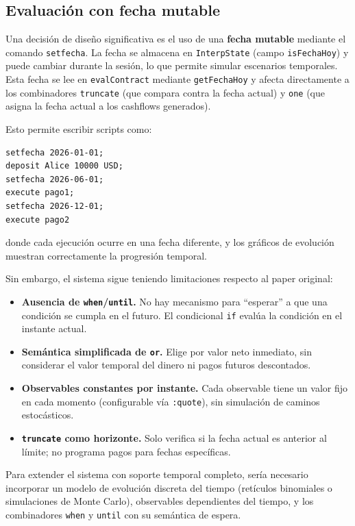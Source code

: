 \documentclass[a4paper, 12pt]{article}
\begin{document}
\subsection{Evaluación con fecha mutable}

Una decisión de diseño significativa es el uso de una \textbf{fecha mutable} mediante el comando \texttt{setfecha}. La fecha se almacena en \texttt{InterpState} (campo \texttt{isFechaHoy}) y puede cambiar durante la sesión, lo que permite simular escenarios temporales. Esta fecha se lee en \texttt{evalContract} mediante \texttt{getFechaHoy} y afecta directamente a los combinadores \texttt{truncate} (que compara contra la fecha actual) y \texttt{one} (que asigna la fecha actual a los cashflows generados).

Esto permite escribir scripts como:

\begin{lstlisting}[style=finstyle, caption={Simulación temporal}, numbers=none]
setfecha 2026-01-01;
deposit Alice 10000 USD;
setfecha 2026-06-01;
execute pago1;
setfecha 2026-12-01;
execute pago2
\end{lstlisting}

donde cada ejecución ocurre en una fecha diferente, y los gráficos de evolución muestran correctamente la progresión temporal.

Sin embargo, el sistema sigue teniendo limitaciones respecto al paper original:

\begin{itemize}
    \item \textbf{Ausencia de \texttt{when}/\texttt{until}.} No hay mecanismo para ``esperar'' a que una condición se cumpla en el futuro. El condicional \texttt{if} evalúa la condición en el instante actual.
    \item \textbf{Semántica simplificada de \texttt{or}.} Elige por valor neto inmediato, sin considerar el valor temporal del dinero ni pagos futuros descontados.
    \item \textbf{Observables constantes por instante.} Cada observable tiene un valor fijo en cada momento (configurable vía \texttt{:quote}), sin simulación de caminos estocásticos.
    \item \textbf{\texttt{truncate} como horizonte.} Solo verifica si la fecha actual es anterior al límite; no programa pagos para fechas específicas.
\end{itemize}

Para extender el sistema con soporte temporal completo, sería necesario incorporar un modelo de evolución discreta del tiempo (retículos binomiales\cite{lattice} o simulaciones de Monte Carlo\cite{montecarlo}), observables dependientes del tiempo, y los combinadores \texttt{when} y \texttt{until} con su semántica de espera.
\end{document}
